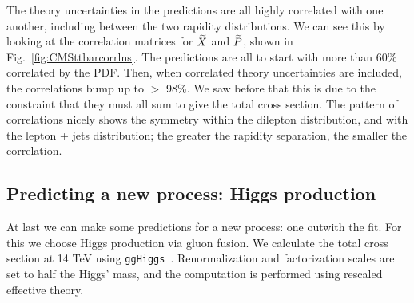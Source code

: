The theory uncertainties in the predictions are all highly correlated with one another, including between the two rapidity distributions. We can see this by looking at the correlation matrices for $\widetilde{X}$ and $\widetilde{P}$, shown in 
Fig.~\ref{fig:CMSttbarcorrlns}. The predictions are all to start with more than 60\% correlated by the PDF. Then, when correlated theory uncertainties are included, the correlations bump up to $>$ 98\%. We saw before that this is due to the constraint that they must all sum to give the total cross section. The pattern of correlations nicely shows the symmetry within the dilepton distribution, and with the lepton + jets distribution; the greater the rapidity separation, the smaller the correlation.

\subsection{Predicting a new process: Higgs production}
At last we can make some predictions for a new process: one outwith the fit. For this we choose Higgs production via gluon fusion. We calculate the total cross section at 14 TeV using {\tt  ggHiggs}~\cite{Ball:2013bra,Bonvini:2014jma,Bonvini:2016frm}.
Renormalization and factorization scales are set to half the Higgs' mass, and the computation is performed using rescaled effective theory.
